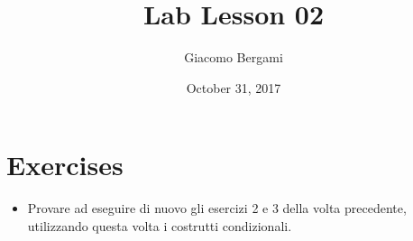 \documentclass[]{scrartcl}
\title{Lab Lesson 02}
\date{October 31, 2017}
\author{Giacomo Bergami}
\begin{document}
\maketitle
\section*{Exercises}

\begin{itemize}
\item Provare ad eseguire di nuovo gli esercizi 2 e 3 della volta precedente, utilizzando questa volta i costrutti condizionali.
\end{itemize}
\end{document}
